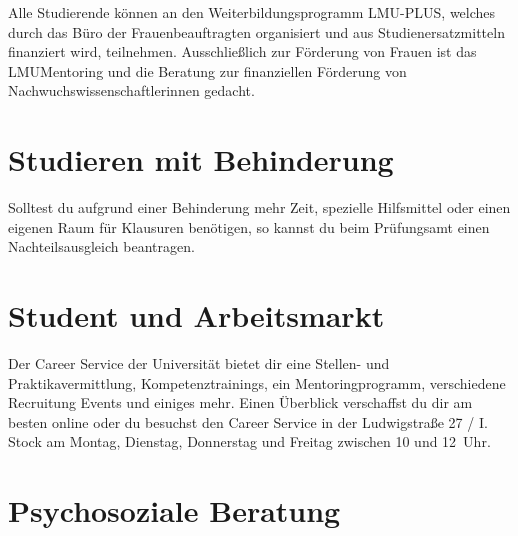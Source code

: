 Alle Studierende können an den Weiterbildungsprogramm LMU-PLUS, welches durch das Büro der Frauenbeauftragten organisiert und aus Studienersatzmitteln finanziert wird, teilnehmen. Ausschließlich zur Förderung von Frauen ist das LMUMentoring und die Beratung zur finanziellen Förderung von Nachwuchswissenschaftlerinnen gedacht.

\begin{urlList}
\end{urlList}


\section{Studieren mit Behinderung}

Solltest du aufgrund einer Behinderung mehr Zeit, spezielle Hilfsmittel oder einen eigenen Raum für Klausuren benötigen, so kannst du beim Prüfungsamt einen Nachteilsausgleich beantragen.

\begin{urlList}
\end{urlList}


\section{Student und Arbeitsmarkt}

Der Career Service der Universität bietet dir eine Stellen- und Praktikavermittlung, Kompetenztrainings, ein Mentoringprogramm, verschiedene Recruitung Events und einiges mehr. Einen Überblick verschaffst du dir am besten online oder du besuchst den Career Service in der Ludwigstraße 27 / I. Stock am Montag, Dienstag, Donnerstag und Freitag zwischen 10 und 12~Uhr.

\begin{urlList}
\end{urlList}


\section{Psychosoziale Beratung}

